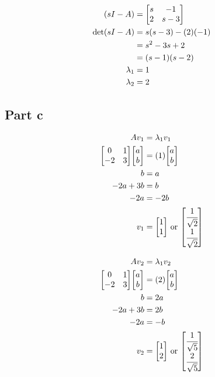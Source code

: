 \documentclass[]{article}
\begin{document}
\begin{align*}
	(sI - A)
	&= \mqty[s & -1\\ 2 & s-3]\\
	\det(sI-A)
	&= s(s-3) - (2)(-1)\\
	&= s^2 -3s + 2\\
	&= (s - 1) (s - 2)\\
	\lambda_1
	&= 1\\
	\lambda_2
	&= 2
\end{align*}

\subsection{Part c}


\begin{align*}
	A v_1
	&= \lambda_1 v_1\\
	\mqty[0&1\\-2&3] \mqty[a\\b]
	&= (1) \mqty[a\\b]\\
	b &= a\\
	-2 a +3 b &= b\\
	-2a &= -2b\\
	v_1 &= \mqty[1\\ 1] \text{ or }  \mqty[\cfrac{1}{\sqrt{2}}\\ \cfrac{1}{\sqrt{2}}]
\end{align*}


\begin{align*}
	A v_2
	&= \lambda_1 v_2\\
	\mqty[0&1\\-2&3] \mqty[a\\b]
	&= (2) \mqty[a\\b]\\
	b &= 2a\\
	-2 a +3 b &= 2b\\
	-2a &= -b\\
	v_2 &= \mqty[1\\ 2] \text{ or }  \mqty[\cfrac{1}{\sqrt{5}}\\ \cfrac{2}{\sqrt{5}}]
\end{align*}
\end{document}
